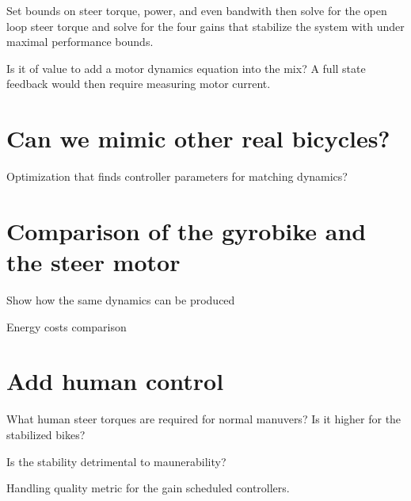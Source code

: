 \documentclass[12pt]{article}
\begin{document}
Set bounds on steer torque, power, and even bandwith then solve for the open
loop steer torque and solve for the four gains that stabilize the system with
under maximal performance bounds.

Is it of value to add a motor dynamics equation into the mix? A full state
feedback would then require measuring motor current.

\section{Can we mimic other real bicycles?}

Optimization that finds controller parameters for matching dynamics?

\section{Comparison of the gyrobike and the steer motor}

Show how the same dynamics can be produced

Energy costs comparison

\section{Add human control}

What human steer torques are required for normal manuvers? Is it higher for the
stabilized bikes?

Is the stability detrimental to maunerability?

Handling quality metric for the gain scheduled controllers.



\end{document}
